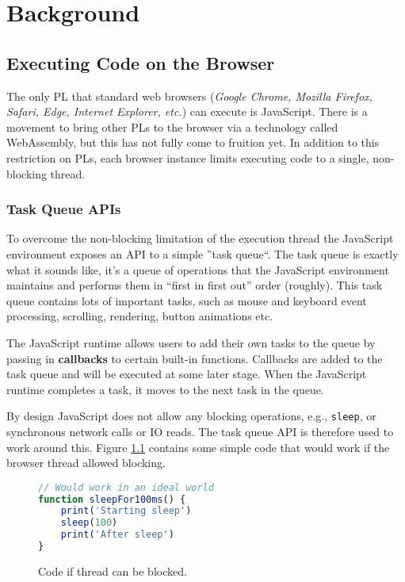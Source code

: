\chapter{Background}

\section{Executing Code on the Browser}

The only PL that standard web browsers (\emph{Google Chrome, Mozilla Firefox, Safari, Edge, Internet Explorer, etc.}) can execute is JavaScript. There is a movement to bring other PLs to the browser via a technology called WebAssembly, but this has not fully come to fruition yet.  
In addition to this restriction on PLs, each browser instance limits executing code to a single, non-blocking thread.

\subsection{Task Queue APIs}\label{background:task-queues}
To overcome the non-blocking limitation of the execution thread the JavaScript environment exposes an API to a simple ''task queue``.
The task queue is exactly what it sounds like, it's a queue of operations that the JavaScript environment maintains and performs them in ``first in first out'' order (roughly). This task queue contains lots of important tasks, such as mouse and keyboard event processing, scrolling, rendering, button animations etc.

The JavaScript runtime allows users to add their own tasks to the queue by passing in \textbf{callbacks} to certain built-in functions. Callbacks are added to the task queue and will be executed at some later stage.
When the JavaScript runtime completes a task, it moves to the next task in the queue.

By design JavaScript does not allow any blocking operations, e.g., \verb|sleep|, or synchronous network calls or IO reads. The task queue API is therefore used to work around this.
Figure \ref{blockingcode} contains some simple code that would work if the browser thread allowed blocking.

\begin{figure}
    \caption{Code if thread can be blocked.}
    \label{blockingcode}
    \begin{lstlisting}[language=javascript]
// Would work in an ideal world
function sleepFor100ms() {
    print('Starting sleep')
    sleep(100)
    print('After sleep')
}
    \end{lstlisting}
\end{figure}


